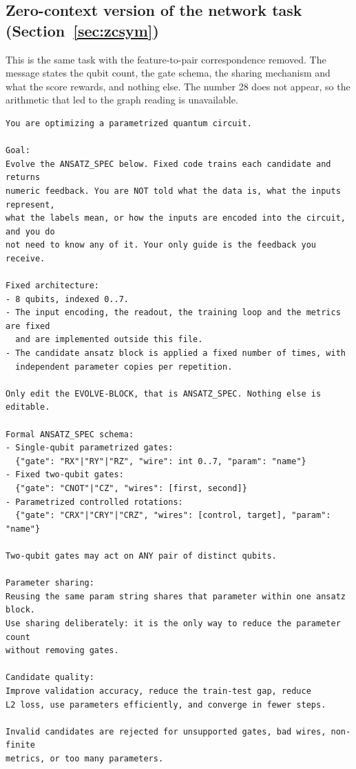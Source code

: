 \subsection{Zero-context version of the network task (Section~\ref{sec:zcsym})}

This is the same task with the feature-to-pair correspondence removed. The
message states the qubit count, the gate schema, the sharing mechanism and what
the score rewards, and nothing else. The number 28 does not appear, so the
arithmetic that led to the graph reading is unavailable.

\begin{lstlisting}[style=prompt]
You are optimizing a parametrized quantum circuit.

Goal:
Evolve the ANSATZ_SPEC below. Fixed code trains each candidate and returns
numeric feedback. You are NOT told what the data is, what the inputs represent,
what the labels mean, or how the inputs are encoded into the circuit, and you do
not need to know any of it. Your only guide is the feedback you receive.

Fixed architecture:
- 8 qubits, indexed 0..7.
- The input encoding, the readout, the training loop and the metrics are fixed
  and are implemented outside this file.
- The candidate ansatz block is applied a fixed number of times, with
  independent parameter copies per repetition.

Only edit the EVOLVE-BLOCK, that is ANSATZ_SPEC. Nothing else is editable.

Formal ANSATZ_SPEC schema:
- Single-qubit parametrized gates:
  {"gate": "RX"|"RY"|"RZ", "wire": int 0..7, "param": "name"}
- Fixed two-qubit gates:
  {"gate": "CNOT"|"CZ", "wires": [first, second]}
- Parametrized controlled rotations:
  {"gate": "CRX"|"CRY"|"CRZ", "wires": [control, target], "param": "name"}

Two-qubit gates may act on ANY pair of distinct qubits.

Parameter sharing:
Reusing the same param string shares that parameter within one ansatz block.
Use sharing deliberately: it is the only way to reduce the parameter count
without removing gates.

Candidate quality:
Improve validation accuracy, reduce the train-test gap, reduce
L2 loss, use parameters efficiently, and converge in fewer steps.

Invalid candidates are rejected for unsupported gates, bad wires, non-finite
metrics, or too many parameters.
\end{lstlisting}


